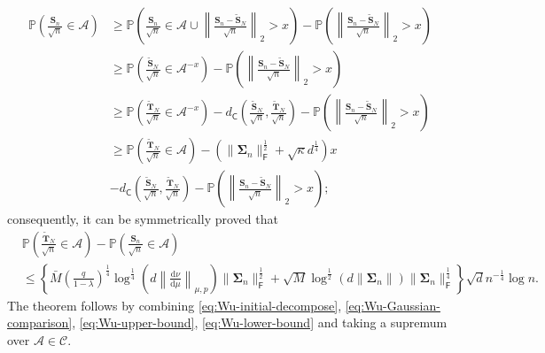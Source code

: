 \begin{align*}
\mathbb{P}\left(\frac{\bm{S}_n}{\sqrt{n}} \in \mathcal{A}\right)& \geq \mathbb{P}\left(\frac{\bm{S}_n}{\sqrt{n}} \in \mathcal{A} \cup \left\|\frac{\bm{S}_n - \tilde{\bm{S}}_N}{\sqrt{n}}\right\|_2 > x\right) - \mathbb{P}\left(\left\|\frac{\bm{S}_n - \tilde{\bm{S}}_N}{\sqrt{n}}\right\|_2 > x\right) \\ 
&\geq \mathbb{P}\left(\frac{\tilde{\bm{S}}_N}{\sqrt{n}} \in \mathcal{A}^{-x} \right) - \mathbb{P}\left(\left\|\frac{\bm{S}_n - \tilde{\bm{S}}_N}{\sqrt{n}}\right\|_2 > x\right) \\ 
&\geq \mathbb{P}\left(\frac{\tilde{\bm{T}}_N}{\sqrt{n}} \in \mathcal{A}^{-x} \right) - d_{\mathsf{C}}\left(\frac{\tilde{\bm{S}}_N}{\sqrt{n}},\frac{\tilde{\bm{T}}_N}{\sqrt{n}}\right)- \mathbb{P}\left(\left\|\frac{\bm{S}_n - \tilde{\bm{S}}_N}{\sqrt{n}}\right\|_2 > x\right)  \\ 
&\geq \mathbb{P}\left(\frac{\tilde{\bm{T}}_N}{\sqrt{n}} \in \mathcal{A} \right) - \left(\|\bm{\Sigma}_n\|_{\mathsf{F}}^{\frac{1}{2}} + \sqrt{\kappa} d^{\frac{1}{4}}\right) x \\ 
&- d_{\mathsf{C}}\left(\frac{\tilde{\bm{S}}_N}{\sqrt{n}},\frac{\tilde{\bm{T}}_N}{\sqrt{n}}\right)- \mathbb{P}\left(\left\|\frac{\bm{S}_n - \tilde{\bm{S}}_N}{\sqrt{n}}\right\|_2 > x\right);
\end{align*}
consequently, it can be symmetrically proved that
\begin{align}\label{eq:Wu-lower-bound}
&\mathbb{P}\left(\frac{\tilde{\bm{T}}_N}{\sqrt{n}} \in \mathcal{A} \right)-\mathbb{P}\left(\frac{\bm{S}_n}{\sqrt{n}} \in \mathcal{A}\right) \nonumber  \\ 
&\leq \left\{\bar{M}\left(\frac{q}{1-\lambda}\right)^{\frac{1}{4}}\log^{\frac{1}{4}}\left(d\left\|\frac{\mathrm{d}\nu}{\mathrm{d}\mu}\right\|_{\mu,p}\right)\|\bm{\Sigma}_n\|_{\mathsf{F}}^{\frac{1}{2}}+ \sqrt{M} \log^{\frac{1}{2}} (d\|\bm{\Sigma}_n\|)\|\bm{\Sigma}_n\|_{\mathsf{F}}^{\frac{1}{4}}\right\}\sqrt{d} n^{-\frac{1}{4}}\log n.
\end{align}
The theorem follows by combining \eqref{eq:Wu-initial-decompose}, \eqref{eq:Wu-Gaussian-comparison}, \eqref{eq:Wu-upper-bound}, \eqref{eq:Wu-lower-bound} and taking a supremum over $\mathcal{A} \in \mathscr{C}$. 



